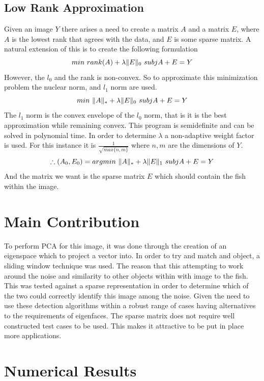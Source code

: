 \documentclass[11pt]{article} %
\DeclarePairedDelimiter{\norm}{\lVert}{\rVert}
\begin{document}
\subsection{Low Rank Approximation}
Given an image $Y$ there arises a need to create a matrix $A$ and a matrix $E$, where $A$ is the lowest rank that agrees with the data, and $E$ is some sparse matrix.
A natural extension of this is to create the following formulation
\[min \ rank(A) + \lambda \norm{E}_0 \ subj A+E=Y\]
However, the $l_0$ and the rank is non-convex. So to approximate this minimization problem the nuclear norm, and $l_1$ norm are used.
\[min \ \norm{A}_{*} + \lambda \norm{E}_{0} \ subj A + E =Y \]
The $l_1$ norm is the convex envelope of the $l_0$ norm, that is it is the best approximation while remaining convex. This program is semidefinite and can be solved in polynomial time.
In order to determine $\lambda$ a non-adaptive weight factor is used. For this instance it is $\frac{1}{\sqrt{max\{n,m\}}}$ where $n,m$ are the dimensions of $Y$.
\[ \therefore (A_{0} ,E_{0}) = argmin \ \norm{A}_{*} + \lambda \norm{E}_{1} \ subj A+E = Y\]
And the matrix we want is the sparse matrix $E$ which should contain the fish within the image.

\section{Main Contribution}
To perform PCA for this image, it was done through the creation of an eigenspace which to project a vector into. In order to try and match and object, a
sliding window technique was used. The reason that this attempting to work around the noise and similarity to other objects within with image to the fish.
\\
This was tested against a sparse representation in order to determine which of the two could correctly identify this image among the noise. Given the
need to use these detection algorithms within a robust range of cases having alternatives to the requirements of eigenfaces. The sparse matrix
does not require well constructed test cases to be used. This makes it attractive to be put in place more applications.

\section{Numerical Results}
\end{document}
